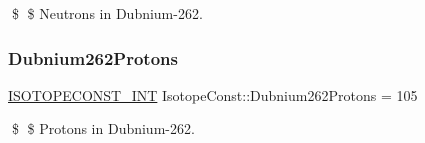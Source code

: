 \$ \$ Neutrons in Dubnium-\/262. \mbox{\label{group___isotope_const-_dubnium-_db262_gaa9ffb8b4a568457c3c57ec8459ae5142}} 
\subsubsection{\texorpdfstring{Dubnium262\+Protons}{Dubnium262Protons}}
{\footnotesize\ttfamily \mbox{\hyperlink{group___isotope_const-_macros_ga5f18360b3e99483a35c32d789e62621c}{I\+S\+O\+T\+O\+P\+E\+C\+O\+N\+S\+T\+\_\+\+I\+NT}} Isotope\+Const\+::\+Dubnium262\+Protons = 105}

\$ \$ Protons in Dubnium-\/262. 